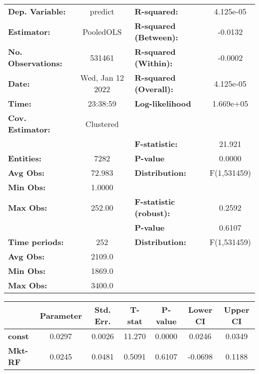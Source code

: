 \begin{center}
\begin{tabular}{lclc}
\toprule
\textbf{Dep. Variable:}    &      predict       & \textbf{  R-squared:         }   &    4.125e-05     \\
\textbf{Estimator:}        &     PooledOLS      & \textbf{  R-squared (Between):}  &     -0.0132      \\
\textbf{No. Observations:} &       531461       & \textbf{  R-squared (Within):}   &     -0.0002      \\
\textbf{Date:}             &  Wed, Jan 12 2022  & \textbf{  R-squared (Overall):}  &    4.125e-05     \\
\textbf{Time:}             &      23:38:59      & \textbf{  Log-likelihood     }   &    1.669e+05     \\
\textbf{Cov. Estimator:}   &     Clustered      & \textbf{                     }   &                  \\
\textbf{}                  &                    & \textbf{  F-statistic:       }   &      21.921      \\
\textbf{Entities:}         &        7282        & \textbf{  P-value            }   &      0.0000      \\
\textbf{Avg Obs:}          &       72.983       & \textbf{  Distribution:      }   &   F(1,531459)    \\
\textbf{Min Obs:}          &       1.0000       & \textbf{                     }   &                  \\
\textbf{Max Obs:}          &       252.00       & \textbf{  F-statistic (robust):} &      0.2592      \\
\textbf{}                  &                    & \textbf{  P-value            }   &      0.6107      \\
\textbf{Time periods:}     &        252         & \textbf{  Distribution:      }   &   F(1,531459)    \\
\textbf{Avg Obs:}          &       2109.0       & \textbf{                     }   &                  \\
\textbf{Min Obs:}          &       1869.0       & \textbf{                     }   &                  \\
\textbf{Max Obs:}          &       3400.0       & \textbf{                     }   &                  \\
\bottomrule
\end{tabular}
\begin{tabular}{lcccccc}
                & \textbf{Parameter} & \textbf{Std. Err.} & \textbf{T-stat} & \textbf{P-value} & \textbf{Lower CI} & \textbf{Upper CI}  \\
\midrule
\textbf{const}  &       0.0297       &       0.0026       &      11.270     &      0.0000      &       0.0246      &       0.0349       \\
\textbf{Mkt-RF} &       0.0245       &       0.0481       &      0.5091     &      0.6107      &      -0.0698      &       0.1188       \\
\bottomrule
\end{tabular}
\end{center}
